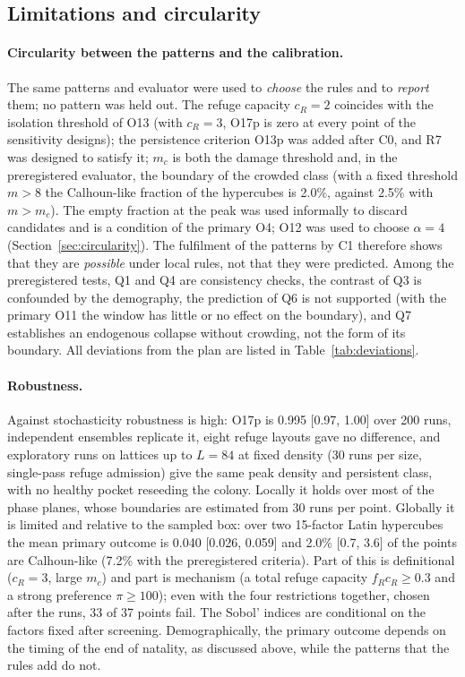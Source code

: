\subsection{Limitations and circularity}
\label{sec:limitations}

\paragraph{Circularity between the patterns and the calibration.}
The same patterns and evaluator were used to \emph{choose} the rules and to \emph{report} them; no pattern was held
out. The refuge capacity $c_R=2$ coincides with the isolation threshold of O13 (with $c_R=3$, O17p is zero at every
point of the sensitivity designs); the persistence criterion O13p was added after \textsf{C0}, and R7 was designed to
satisfy it; $m_c$ is both the damage threshold and, in the preregistered evaluator, the boundary of the crowded class (with a fixed
threshold $m>8$ the Calhoun-like fraction of the hypercubes is 2.0\%, against 2.5\% with $m>m_c$). The empty fraction
at the peak was used informally to discard candidates and is a condition of the
primary O4; O12 was used to choose $\alpha=4$ (Section~\ref{sec:circularity}).
The fulfilment of the patterns by \textsf{C1} therefore shows that they are \emph{possible} under local rules, not
that they were predicted. Among the preregistered tests, Q1 and Q4 are consistency checks, the contrast of Q3 is
confounded by the demography, the prediction of Q6 is not supported (with the primary O11 the window has little or no
effect on the boundary), and Q7 establishes an endogenous collapse without crowding, not the form of its boundary. All deviations from the plan are listed in Table~\ref{tab:deviations}.

\paragraph{Robustness.}
Against stochasticity robustness is high: O17p is 0.995 [0.97, 1.00] over 200 runs, independent ensembles replicate
it, eight refuge layouts gave no difference, and exploratory runs on lattices up to $L=84$ at fixed
density (30 runs per size, single-pass refuge admission) give the same peak density and persistent class, with no healthy pocket reseeding the colony. Locally it holds over most of
the phase planes, whose boundaries are estimated from 30 runs per point. Globally it is limited and relative to the
sampled box: over two 15-factor Latin hypercubes the mean primary outcome is 0.040 [0.026, 0.059] and 2.0\%
[0.7, 3.6] of the points are Calhoun-like (7.2\% with the preregistered criteria). Part of this is definitional ($c_R=3$,
large $m_c$) and part is mechanism (a total refuge capacity $f_Rc_R\ge0.3$ and a strong preference $\pi\ge100$); even
with the four restrictions together, chosen after the runs, 33 of 37 points fail. The Sobol' indices are conditional
on the factors fixed after screening. Demographically, the primary outcome depends on the timing of the end of natality, as discussed above, while the
patterns that the rules add do not.

